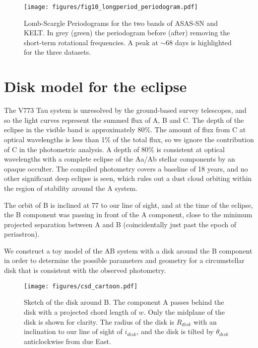 \documentclass{aa}
\begin{document}
%
\begin{figure}[ht]
    \centering
    \texttt{[image: figures/fig10\_longperiod\_periodogram.pdf]}
    \caption{Lomb-Scargle Periodograms for the two bands of ASAS-SN and KELT.
    In grey (green) the periodogram before (after) removing the short-term rotational frequencies.
    A peak at $\sim 68$ days is highlighted for the three datasets.}
  \label{fig:long_periodogram}
\end{figure}

\section{Disk model for the eclipse\label{sec:model}}

The V773 Tau system is unresolved by the ground-based survey telescopes, and so the light curves represent the summed flux of A, B and C.
%
The depth of the eclipse in the visible band is approximately 80\%.
%
The amount of flux from C at optical wavelengths is less than 1\% of the total flux, so we ignore the contribution of C in the photometric analysis.
%
A depth of 80\% is consistent at optical wavelengths with a complete eclipse of the Aa/Ab stellar components by an opaque occulter.
%
The compiled photometry covers a baseline of 18 years, and no other significant deep eclipse is seen, which rules out a dust cloud orbiting within the region of stability around the A system.

The orbit of B is inclined at 77\degr{} to our line of sight, and at the time of the eclipse, the B component was passing in front of the A component, close to the minimum projected separation between A and B (coincidentally just past the epoch of periastron).


We construct a toy model of the AB system with a disk around the B component in order to determine the possible parameters and geometry for a circumstellar disk that is consistent with the observed photometry.

\begin{figure}[ht]
\begin{center}
    \centering
    \texttt{[image: figures/csd\_cartoon.pdf]}
    \caption{Sketch of the disk around B.
    The component A passes behind the disk with a projected chord length of $w$.
    Only the midplane of the disk is shown for clarity.
    The radius of the disk is $R_{disk}$ with an inclination to our line of sight of $i_{disk}$, and the disk is tilted by $\theta_{disk}$\degr{} anticlockwise from due East.}
\label{fig:csdcartoon}
\end{center}
\end{figure}
\end{document}
